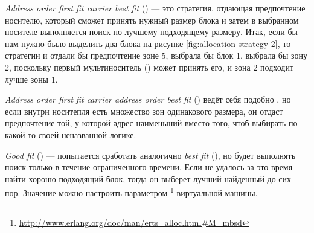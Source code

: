 \emph{Address order first fit carrier best fit} () --- это стратегия, отдающая предпочтение носителю, который сможет принять нужный размер блока и затем в выбранном носителе выполняется поиск по лучшему подходящему размеру. Итак, если бы нам нужно было выделить два блока на рисунке \ref{fig:allocation-strategy-2}, то стратегии  и  отдали бы предпочтение зоне 5,  выбрала бы блок 1.  выбрала бы зону 2, поскольку первый мультиноситель () может принять его, и зона 2 подходит лучше зоны 1.

\emph{Address order first fit carrier address order best fit} () ведёт себя подобно , но если внутри носитепля есть множество зон одинакового размера, он отдаст предпочтение той, у которой адрес наименьший вместо того, чтоб выбирать по какой-то своей неназванной логике.

\emph{Good fit} () --- попытается сработать аналогично \emph{best fit} (), но будет выполнять поиск только в течение ограниченного времени. Если не удалось за это время найти хорошо подходящий блок, тогда он выберет лучший найденный до сих пор. Значение можно настроить параметром \footnote{\href{http://www.erlang.org/doc/man/erts\_alloc.html\#M\_mbsd}{http://www.erlang.org/doc/man/erts\_alloc.html\#M\_mbsd}} виртуальной машины.

